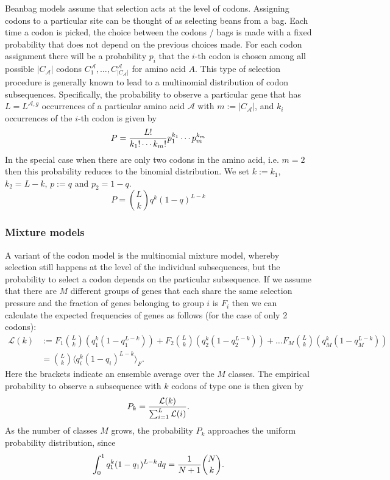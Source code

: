 \documentclass[a4paper,10pt]{paper}%
\begin{document}
Beanbag models assume that selection acts at the level of codons. Assigning codons to a particular site can be thought of as selecting beans from a bag. Each time a codon is picked, the choice   between the codons / bags is made   with a fixed probability that does not depend on the previous choices made.  For each codon assignment there will be a probability $p_i$ that the $i$-th codon is chosen among all possible $|C_{\mathcal A}|$ codons $C_1^\mathcal A,\ldots,C_{|C_{\mathcal A}|}^\mathcal A$ for amino acid $A$.  
This type of selection procedure is generally known to lead  to a  multinomial distribution of codon subsequences. Specifically,  the probability to observe  a particular gene that   has $L=L^{\mathcal A,g}$ occurrences of a particular amino acid $\mathcal A$ with $m:=|C_{\mathcal A}|$, and $k_i$ occurrences of  the $i$-th codon is  given by
%
% 
\begin{equation}
P = {L!\over k_1!\cdots k_{m}!} p_1^{k_1}\cdots p_m^{k_m}
\end{equation}
%
% 
In the special case when  there are only two codons in the amino acid, i.e. $m=2$ then this probability reduces to the binomial distribution. We set $k:=k_1$,  $k_2=L-k$, $p:=q$ and $p_2=1-q$.
%
% 
\begin{equation}
P = \binom{L}{k} q^{k} (1-q)^{L-k}
\label{binomial}
\end{equation}
%
%  



\subsubsection{Mixture models}

A variant of the codon model is  the multinomial mixture model, whereby  selection still happens at  the level of the individual subsequences, but the probability to select a codon depends on the particular subsequence. If we assume that there are $M$ different groups of genes that each share the same selection pressure and the fraction of genes belonging to group $i$ is $F_i$ then we can calculate the  expected frequencies of genes as follows (for the case of only 2 codons):
%
% 
\begin{align*}
\mathcal L(k) &:=  F_1 \binom{L}{k} \left(q_1^k(1-q_1^{L-k}) \right) +
F_2 \binom{L}{k} \left(q_2^k(1-q_2^{L-k}) \right)+\ldots
F_M \binom{L}{k} \left(q_M^k(1-q_M^{L-k}) \right)\nonumber\\
&= \binom{L}{k} \langle q_i^k(1-q_i)^{L-k}\rangle_F .
\end{align*}
%
%   
Here the brackets indicate an ensemble average over the $M$ classes. The empirical probability to observe a subsequence with $k$ codons of type one is then given by 
%
% 
\begin{equation}
P_k = {\mathcal L(k)\over \sum_{i=1}^L \mathcal L(i)}.
\end{equation}
%
% 
As the number of classes  $M$ grows, the probability $P_k$ approaches the uniform probability distribution, since 
%
% 
\begin{displaymath}
\int_0^1 q_1^k(1-q_1)^{L-k} dq= {1\over N+1} \binom{N}{k}.
\end{displaymath}
%
\end{document}
